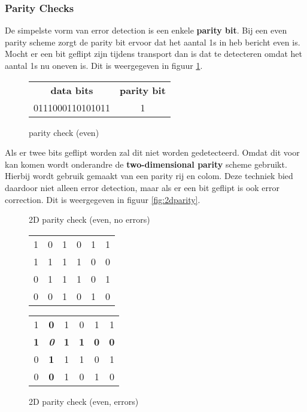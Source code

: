 \subsubsection{Parity Checks} 
De simpelste vorm van error detection is een enkele \textbf{parity bit}. Bij een even parity scheme zorgt de parity bit ervoor dat het aantal 1s in heb bericht even is.
Mocht er een bit geflipt zijn tijdens transport dan is dat te detecteren omdat het aantal 1s nu oneven is. Dit is weergegeven in figuur \ref{fig:parity}.

\begin{figure}[!ht]
  \begin{center}
    \caption{parity check (even)}
    \label{fig:parity}
    \begin{tabular}{c c} 
      \textbf{data bits} & \textbf{parity bit} \\
      0111000110101011 & 1 \\
    \end{tabular}
  \end{center}
\end{figure}

Als er twee bits geflipt worden zal dit niet worden gedetecteerd. Omdat dit voor kan komen wordt onderandre de \textbf{two-dimensional parity} scheme gebruikt. 
Hierbij wordt gebruik gemaakt van een parity rij en colom. Deze techniek bied daardoor niet alleen error detection, maar als er een bit geflipt is ook error correction. 
Dit is weergegeven in figuur \ref{fig:2dparity}.

\begin{figure}[!ht]
  \begin{center}
    
    \caption{2D parity check (even, no errors)}
    \label{fig:2dparity}
    \begin{tabular}{c c c c c|c} 
      1 & 0 & 1 & 0 & 1   & 1 \\
      1 & 1 & 1 & 1 & 0   & 0 \\
      0 & 1 & 1 & 1 & 0   & 1 \\ \hline
      0 & 0 & 1 & 0 & 1   & 0 \\
    \end{tabular}
    
    
    \caption{2D parity check (even, errors)}
    \label{fig:2dparityerrors}
    \begin{tabular}{c c c c c|c} 
      1 & \textbf{0} & 1 & 0 & 1   & 1 \\
      \textbf{1} & \textbf{\textit{0}} & \textbf{1} & \textbf{1} & \textbf{0}   & \textbf{0} \\
      0 & \textbf{1} & 1 & 1 & 0   & 1 \\ \hline
      0 & \textbf{0} & 1 & 0 & 1   & 0 \\      
    \end{tabular}
  
  \end{center}
\end{figure}

